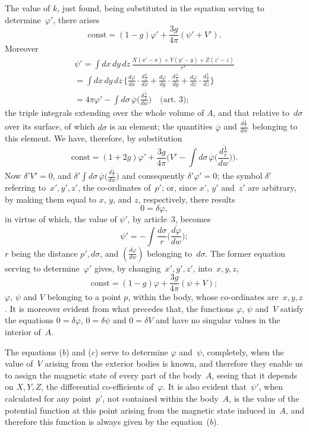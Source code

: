 \documentclass[11pt,notitlepage]{amsart}
\renewcommand{\phi}{\varphi}
\begin{document}
The value of $k$, just found, being substituted in the equation serving
to determine~$\phi'$, there arises
\[
\text{const}=(1-g)\phi'+\frac{3g}{4\pi}(\psi'+V').
\]
Moreover
\begin{multline*}
\psi'=\int dx\,dy\,dz\,\frac{X(x'-x)+Y(y'-y)+Z(z'-z)}{r^3}\\
=\int dx\,dy\,dz\,\biggl\{
  \frac{d\phi}{dx}\cdot\frac{d\frac1r}{dx}
  +\frac{d\phi}{dy}\cdot\frac{d\frac1r}{dy}
  +\frac{d\phi}{dz}\cdot\frac{d\frac1r}{dz}
\biggr\}\\
=4\pi\phi'-\int d\sigma\,\overline\phi
\biggl(\frac{\overline{d\frac1r}}{dw}\biggr)
\quad\text{(art.~3)};
\end{multline*}
the triple integrals extending over the whole volume of $A$, and that relative
to~$d\sigma$ over its surface, of which $d\sigma$ is an element;
the quantities $\overline\phi$ and
$\frac{\overline{d\frac1r}}{dw}$~belonging to this element.
We have, therefore, by substitution
\[
\text{const}=(1+2g)\phi'+
\frac{3g}{4\pi}\Biggl(V'-
\int d\sigma\,\overline\phi\biggl(\frac{\overline{d\frac1r}}{dw}\biggr)\Biggr).
\]
Now $\delta'V'=0$, and
$\delta'\int d\sigma\,\overline\phi\bigl(\frac{\overline{d\frac1r}}{dw}\bigr)$
and consequently ${\delta'\phi'=0}$; the
symbol $\delta'$ referring to~$x',y',z'$,
the co-ordinates of~$p'$; or, since $x$', $y'$ and~$z'$
are arbitrary, by making them equal to $x$, $y$, and $z$,
respectively, there results
\[
0=\delta\phi,
\]
in virtue of which, the value of $\psi'$, by article~3, becomes
\[
\tag{$b$.}
\psi'=-\int\frac{d\sigma}{r}\biggl(\frac{\overline{d\phi}}{dw}\biggr);
\]
$r$ being the distance $p',d\sigma$,
and $(\frac{\overline{d\phi}}{dw})$  belonging to~$d\sigma$. The former equation
serving to determine~$\phi'$ gives, by changing~$x',y',z'$, into~$x,y,z$,
\[
\tag{$c$.}
\text{const}=(1-g)\phi+\frac{3g}{4\pi}(\psi+V);
\]
$\phi$, $\psi$ and $V$ belonging to a point $p$,
within the body, whose co-ordinates
are~$x,y,z$. It is moreover evident from what precedes that, the functions
$\phi$, $\psi$ and~$V$ satisfy the equations
$0=\delta\phi$, $0=\delta\psi$ and $0=\delta V$ and have
no singular values in the interior of~$A$.

The equations ($b$) and ($c$) serve to determine $\phi$ and~$\psi$, completely,
when the value of~$V$ arising from the exterior bodies is known, and therefore
they enable us to assign the magnetic state of every part of the body~$A$,
seeing that it depends on $X, Y, Z$, the differential co-efficients of~$\phi$.
It is
also evident that~$\psi'$, when calculated for any point~$p'$,
not contained within
the body~$A$, is the value of the potential function at this point arising from
the magnetic state induced in~$A$, and therefore this function is always given
by the equation~($b$).
\end{document}
